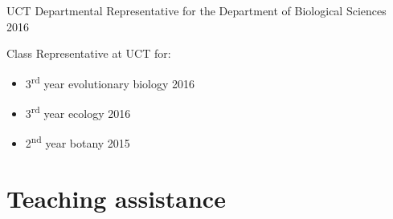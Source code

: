 \documentclass[10pt]{article}
\begin{document}
UCT Departmental Representative for the Department of Biological Sciences
                                                                     \hfill 2016

Class Representative at UCT for:

\begin{itemize}[noitemsep, nolistsep]
  \item 3\textsuperscript{rd} year evolutionary biology              \hfill 2016
  \item 3\textsuperscript{rd} year ecology                           \hfill 2016
  \item 2\textsuperscript{nd} year botany                            \hfill 2015
\end{itemize}

\section*{Teaching assistance} %

\end{document}
